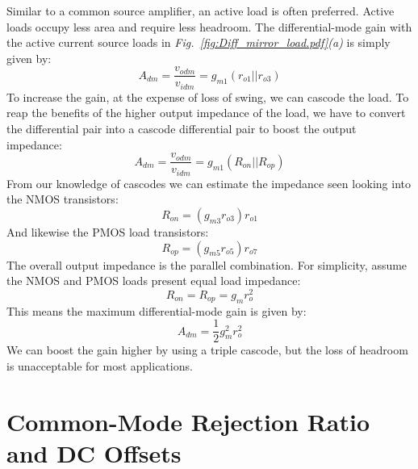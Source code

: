 Similar to a common source amplifier, an active load is often preferred.  Active loads occupy less area and require less headroom.  The differential-mode gain with the active current source loads in \emph{Fig.~\ref{fig:Diff_mirror_load.pdf}(a)} is simply given by:
    \begin{equation}
        {A_{dm}} = \frac{{{v_{odm}}}}{{{v_{idm}}}} = {g_{m1}}\left( {{r_{o1}}||{r_{o3}}} \right)
    \end{equation}
To increase the gain, at the expense of loss of swing, we can cascode the load.  To reap the benefits of the higher output impedance of the load, we have to convert the differential pair into a cascode differential pair to boost the output impedance:
    \begin{equation}
        {A_{dm}} = \frac{{{v_{odm}}}}{{{v_{idm}}}} = {g_{m1}}\left( {{R_{on}}||{R_{op}}} \right) 
    \end{equation}
From our knowledge of cascodes we can estimate the impedance seen looking into the NMOS transistors:
    \begin{equation}
        {R_{on}} = \left( {{g_{m3}}{r_{o3}}} \right){r_{o1}} 
    \end{equation}
And likewise the PMOS load transistors:
    \begin{equation}
        {R_{op}} = \left( {{g_{m5}}{r_{o5}}} \right){r_{o7}}
    \end{equation}
The overall output impedance is the parallel combination.  For simplicity, assume the NMOS and PMOS loads present equal load impedance:
    \begin{equation}
        {R_{on}} = {R_{op}} = {g_m}r_o^2
    \end{equation}
This means the maximum differential-mode gain is given by:
    \begin{equation}
        {A_{dm}} = \frac{1}{2}g_m^2r_o^2
    \end{equation}
We can boost the gain higher by using a triple cascode, but the loss of headroom is unacceptable for most applications.
\section{Common-Mode Rejection Ratio and DC Offsets}
\label{sec:cmrr}
